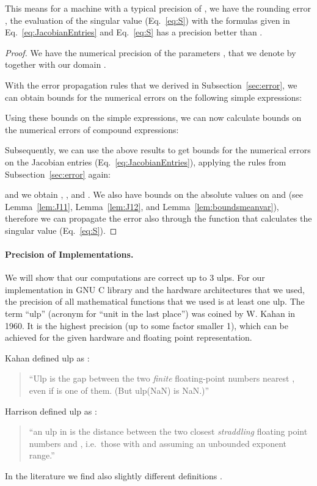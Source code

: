 \documentclass{article}
\begin{document}
This means for a machine with a typical precision of , we have the rounding error , the evaluation 
of the singular value (Eq.~\eqref{eq:S}) with the formulas given in Eq.~\eqref{eq:JacobianEntries} and Eq.~\eqref{eq:S} has 
a precision better than .

\begin{proof}
We have the numerical precision  of the parameters , that we denote by
 together with our domain .

With the error propagation rules that we derived in Subsection~\ref{sec:error}, we 
can obtain bounds for the numerical errors on the following simple expressions:


Using these bounds on the simple expressions, we can now calculate bounds on the numerical errors of compound expressions:



Subsequently, we can use the above results to get bounds for the numerical errors on the Jacobian entries (Eq.~\eqref{eq:JacobianEntries}), 
applying the rules from Subsection~\ref{sec:error} again:


and we obtain ,  , 
and . 
We also have bounds on the absolute values on  and  (see Lemma~\ref{lem:J11},
Lemma~\ref{lem:J12}, and Lemma~\ref{lem:boundsmeanvar}), therefore we can 
propagate the error also through the function that calculates the singular value (Eq.~\eqref{eq:S}). 


\end{proof}




\paragraph{Precision of Implementations.}
We will show that our computations are correct up to 3 ulps. For
our implementation in GNU C library and the hardware architectures
that we used, the precision of all mathematical functions that we used
is at least one ulp.
The term ``ulp'' (acronym for ``unit in the last place'') was coined
by W. Kahan in 1960. It is the highest precision (up to some factor
smaller 1), which can be
achieved for the given hardware and floating point representation.

Kahan defined ulp as \citep{Kahan:04}:
\begin{quote}
``Ulp is the gap between the two {\em finite} floating-point numbers
nearest , even if  is one of them. (But ulp(NaN) is NaN.)''
\end{quote}
Harrison defined ulp as \citep{Harrison:99}:
\begin{quote}
``an ulp in  is the distance
between the two closest {\em straddling} floating point numbers  and , i.e.\ those with
 and  assuming an unbounded exponent range.''
\end{quote}
In the literature we find also slightly different definitions
\citep{Muller:05}.
\end{document}
